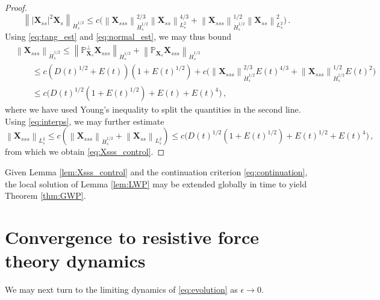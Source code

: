 \documentclass[11pt,reqno]{amsart}
\renewcommand{\P}{\mathbb{P}}
\newcommand{\X}{\bm{X}}
\newcommand{\abs}[1]{\left\lvert #1 \right\rvert}
\newcommand{\norm}[1]{\left\lVert #1 \right\rVert}
\numberwithin{equation}{section}
\theoremstyle{definition}
\begin{document}
\begin{proof}
\begin{equation}\label{eq:tang_est}
  \norm{\abs{\X_{ss}}^2\X_s}_{\dot H^{1/2}_s} 
  \le c\big(\norm{\X_{sss}}_{\dot H^{1/2}_s}^{2/3}\norm{\X_{ss}}_{L^2_s}^{4/3}
  + \norm{\X_{sss}}_{\dot H^{1/2}_s}^{1/2}\norm{\X_{ss}}_{L^2_s}^2\big)\,.
\end{equation}
%
%
Using \eqref{eq:tang_est} and \eqref{eq:normal_est}, we may thus bound
\begin{equation}
\begin{aligned}
  &\norm{\X_{sss}}_{\dot H^{1/2}_s} \le \norm{\P_{\X_s}^\perp\X_{sss}}_{\dot H^{1/2}_s} + \norm{\P_{\X_s}\X_{sss}}_{\dot H^{1/2}_s}\\
  &\qquad\le c(D(t)^{1/2}+E(t))(1+E(t)^{1/2}) + c\big(\norm{\X_{sss}}_{\dot H^{1/2}_s}^{2/3}E(t)^{4/3}
  + \norm{\X_{sss}}_{\dot H^{1/2}_s}^{1/2}E(t)^2\big)\\
  &\qquad \le c\big( D(t)^{1/2}(1+E(t)^{1/2}) + E(t)+ E(t)^4\big)\,,
\end{aligned}
\end{equation}
where we have used Young's inequality to split the quantities in the second line. Using \eqref{eq:interps}, we may further estimate
\begin{equation}
    \norm{\X_{sss}}_{L^2_s} \le c(\norm{\X_{sss}}_{\dot H^{1/2}_s}+\norm{\X_{ss}}_{L^2_s})
    \le c\big( D(t)^{1/2}(1+E(t)^{1/2}) + E(t)^{1/2}+ E(t)^4\big)\,,
\end{equation}  
from which we obtain \eqref{eq:Xsss_control}.
%
\end{proof}



Given Lemma \ref{lem:Xsss_control} and the continuation criterion \eqref{eq:continuation}, the local solution of Lemma \ref{lem:LWP} may be extended globally in time to yield Theorem \ref{thm:GWP}. 




\section{Convergence to resistive force theory dynamics}\label{sec:RFTconverge}
We may next turn to the limiting dynamics of \eqref{eq:evolution} as $\epsilon\to 0$. 
\end{document}
